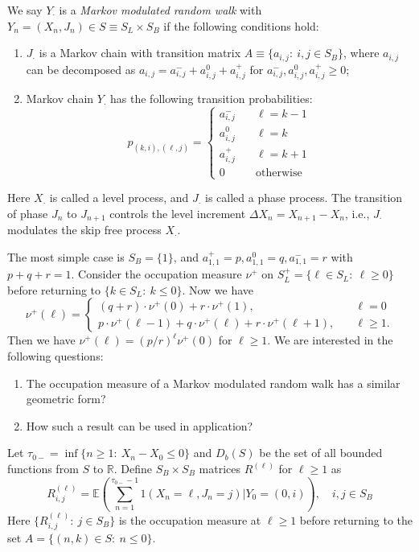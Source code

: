 \begin{definition}
We say $Y_{\cdot}$ is a \emph{Markov modulated random walk} with $Y_n=(X_n,J_n)\in S\equiv S_L\times S_B$ if the following conditions hold:
\begin{enumerate}
\item
$J_{\cdot}$ is a Markov chain with transition matrix $A\equiv\{a_{i,j}:~i,j\in S_B\}$, where $a_{i,j}$ can be decomposed as $a_{i,j}=a_{i,j}^- + a_{i,j}^0 + a_{i,j}^+$ for $a_{i,j}^- ,a_{i,j}^0,a_{i,j}^+\ge0$;
\item
Markov chain $Y_{\cdot}$ has the following transition probabilities:
\[
p_{(k,i), (\ell,j)}=\left\{
\begin{aligned}
a_{i,j}^-&\quad \ell=k-1\\
a_{i,j}^0&\quad \ell=k\\
a_{i,j}^+&\quad \ell=k+1\\
0&\quad\text{otherwise}
\end{aligned}
\right.
\]
\end{enumerate}
Here $X_{\cdot}$ is called a level process, and $J_{\cdot}$ is called a phase process.
The transition of phase $J_n$ to $J_{n+1}$ controls the level increment $\Delta X_n=X_{n+1}-X_n$, i.e., $J_{\cdot}$ modulates the skip free process $X_{\cdot}$.
\end{definition}
The most simple case is $S_B=\{1\}$, and $a^+_{1,1}=p, a^0_{1,1}=q, a^-_{1,1}=r$ with $p+q+r=1$.
Consider the occupation measure $\nu^+$ on $S_L^+=\{\ell\in S_L:~\ell\ge0\}$ before returning to $\{k\in S_L:~k\le0\}$.
Now we have
\[
\nu^+(\ell)=\left\{
\begin{aligned}
(q+r)\cdot\nu^+(0) + r\cdot \nu^+(1),&\quad \ell=0\\
p\cdot\nu^+(\ell-1) + q\cdot\nu^+(\ell) + r\cdot\nu^+(\ell+1),&\quad \ell\ge1.
\end{aligned}
\right.
\]
Then we have $\nu^+(\ell)=(p/r)^{\ell}\nu^+(0)$ for $\ell\ge1$.
We are interested in the following questions:
\begin{enumerate}
\item
The occupation measure of a Markov modulated random walk has a similar geometric form?
\item
How such a result can be used in application?
\end{enumerate}

\begin{definition}
Let $\tau_{0-}=\inf\{n\ge1:~X_n-X_0\le0\}$ and $D_b(S)$ be the set of all bounded functions from $S$ to $\mathbb{R}$.
Define $S_B\times S_B$ matrices $R^{(\ell)}$ for $\ell\ge1$ as
\[
R_{i,j}^{(\ell)}=\mathbb{E}\left(
\sum_{n=1}^{\tau_{0-}-1}1(X_n = \ell, J_n=j)\bigg| Y_0=(0,i)
\right),\quad i,j\in S_B
\]
Here $\{R_{i,j}^{(\ell)}:~j\in S_B\}$ is the occupation measure at $\ell\ge1$
before returning to the set $A=\{(n,k)\in S:~n\le0\}$.
\end{definition}

